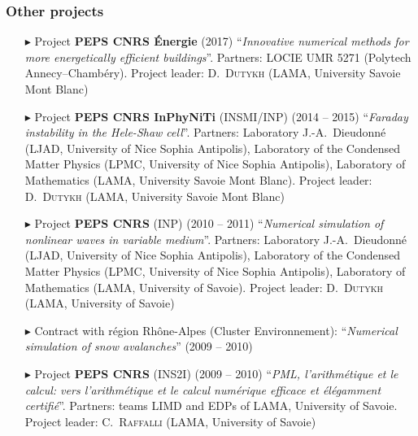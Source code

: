 \subsubsection{Other projects}
\begin{itemize}
    \item[$\blacktriangleright$] Project \textbf{PEPS CNRS \'Energie} (2017) ``\textit{Innovative numerical methods for more energetically efficient buildings}''. Partners: LOCIE UMR 5271 (Polytech Annecy--Chamb\'ery). Project leader: D.~\textsc{Dutykh} (LAMA, University Savoie Mont Blanc)
    \item[$\blacktriangleright$] Project \textbf{PEPS CNRS InPhyNiTi} (INSMI/INP) (2014 -- 2015) ``\textit{Faraday instability in  the Hele-Shaw cell}''. Partners: Laboratory J.-A.~Dieudonn\'e (LJAD, University of Nice Sophia Antipolis), Laboratory of the Condensed Matter Physics (LPMC, University of Nice Sophia Antipolis), Laboratory of Mathematics (LAMA, University Savoie Mont Blanc). Project leader: D.~\textsc{Dutykh} (LAMA, University Savoie Mont Blanc)
    \item[$\blacktriangleright$] Project \textbf{PEPS CNRS} (INP) (2010 -- 2011) ``\textit{Numerical simulation of nonlinear waves in variable medium}''. Partners: Laboratory J.-A.~Dieudonn\'e (LJAD, University of Nice Sophia Antipolis), Laboratory of the Condensed Matter Physics (LPMC, University of Nice Sophia Antipolis), Laboratory of Mathematics (LAMA, University of Savoie). Project leader: D.~\textsc{Dutykh} (LAMA, University of Savoie)
    \item[$\blacktriangleright$] Contract with r\'egion Rh\^one-Alpes (Cluster Environnement): ``\textit{Numerical simulation of snow avalanches}'' (2009 -- 2010)
    \item[$\blacktriangleright$] Project \textbf{PEPS CNRS} (INS2I) (2009 -- 2010) ``\textit{PML, l'arithm\'etique et le calcul: vers l'arithm\'etique et le calcul num\'erique efficace et \'el\'egamment certifi\'e}''. Partners: teams LIMD and EDPs of LAMA, University of Savoie. Project leader: C.~\textsc{Raffalli} (LAMA, University of Savoie)
\end{itemize}
